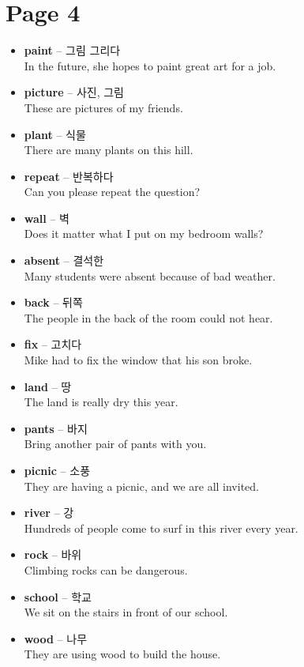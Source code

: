 \documentclass[12pt]{article}
\begin{document}
\newpage
\section*{Page 4}
\begin{itemize}
    \item \textbf{paint} -- 그림 그리다 \\
    In the future, she hopes to paint great art for a job.
    \item \textbf{picture} -- 사진, 그림 \\
    These are pictures of my friends.
    \item \textbf{plant} -- 식물 \\
    There are many plants on this hill.
    \item \textbf{repeat} -- 반복하다 \\
    Can you please repeat the question?
    \item \textbf{wall} -- 벽 \\
    Does it matter what I put on my bedroom walls?
    \item \textbf{absent} -- 결석한 \\
    Many students were absent because of bad weather.
    \item \textbf{back} -- 뒤쪽 \\
    The people in the back of the room could not hear.
    \item \textbf{fix} -- 고치다 \\
    Mike had to fix the window that his son broke.
    \item \textbf{land} -- 땅 \\
    The land is really dry this year.
    \item \textbf{pants} -- 바지 \\
    Bring another pair of pants with you.
    \item \textbf{picnic} -- 소풍 \\
    They are having a picnic, and we are all invited.
    \item \textbf{river} -- 강 \\
    Hundreds of people come to surf in this river every year.
    \item \textbf{rock} -- 바위 \\
    Climbing rocks can be dangerous.
    \item \textbf{school} -- 학교 \\
    We sit on the stairs in front of our school.
    \item \textbf{wood} -- 나무 \\
    They are using wood to build the house.
\end{itemize}
\end{document}
